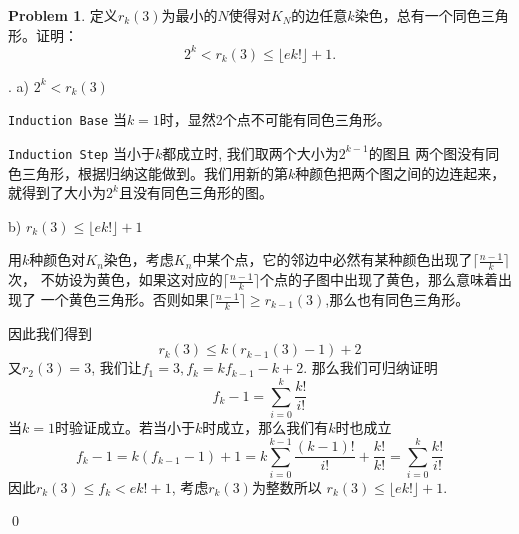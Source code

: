 \documentclass[UTF8]{ctexart}
\newenvironment{sol}
  {\par\vspace{3mm}\noindent{\it Solution}.}
  {\qed \\ \medskip}
\theoremstyle{definition}
\newtheorem{problem}{Problem}
\begin{document}
\begin{problem}
定义$r_k(3)$为最小的$N$使得对$K_N$的边任意$k$染色，总有一个同色三角形。证明：
\[
2^k < r_k(3) \leq \lfloor e k! \rfloor + 1.
\]

\begin{sol}
  a) $2^k < r_k(3)$

  \texttt{Induction Base} 当$k=1$时，显然2个点不可能有同色三角形。

  \texttt{Induction Step} 当小于$k$都成立时, 我们取两个大小为$2^{k-1}$的图且
  两个图没有同色三角形，根据归纳这能做到。我们用新的第$k$种颜色把两个图之间的边连起来，
  就得到了大小为$2^k$且没有同色三角形的图。

  b) $r_k(3) \leq \lfloor e k! \rfloor + 1$

  用$k$种颜色对$K_n$染色，考虑$K_n$中某个点，它的邻边中必然有某种颜色出现了$\lceil \frac {n-1} k \rceil$次，
  不妨设为黄色，如果这对应的$\lceil \frac {n-1} k \rceil$个点的子图中出现了黄色，那么意味着出现了
  一个黄色三角形。否则如果$\lceil \frac {n-1} k \rceil \geq r_{k-1}(3)$,那么也有同色三角形。

  因此我们得到
  $$
  r_k(3) \leq k(r_{k-1}(3)-1) + 2
  $$
  又$r_2(3)=3$, 我们让$f_1=3, f_k=kf_{k-1}-k+2$. 那么我们可归纳证明
  $$
  f_k - 1 = \sum_{i=0}^k\frac{k!}{i!}
  $$
  当$k=1$时验证成立。若当小于$k$时成立，那么我们有$k$时也成立
  $$
  f_k-1=k(f_{k-1} - 1) + 1 = k \sum_{i=0}^{k-1}\frac {(k-1)!} {i!} + \frac {k!}{k!}=\sum_{i=0}^k\frac{k!}{i!}
  $$
  因此$r_k(3) \leq f_k < ek! + 1$, 考虑$r_k(3)$为整数所以 $r_k(3) \leq \lfloor e k! \rfloor + 1$.


\end{sol}
\end{problem}
\end{document}
